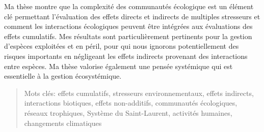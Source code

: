 Ma thèse montre que la complexité des communautés écologique est un
élément clé permettant l'évaluation des effets directs et indirects de
multiples stresseurs et comment les interactions écologiques peuvent
être intégrées aux évaluations des effets cumulatifs. Mes résultats sont
particulièrement pertinents pour la gestion d'espèces exploitées et en
péril, pour qui nous ignorons potentiellement des risques importants en
négligeant les effets indirects provenant des interactions entre
espèces. Ma thèse valorise également une pensée systémique qui est
essentielle à la gestion écosystémique.

\begin{quote}
Mots clés: effets cumulatifs, stresseurs environnementaux, effets
indirects, interactions biotiques, effets non-additifs, communautés
écologiques, réseaux trophiques, Système du Saint-Laurent, activités
humaines, changements climatiques
\end{quote}
